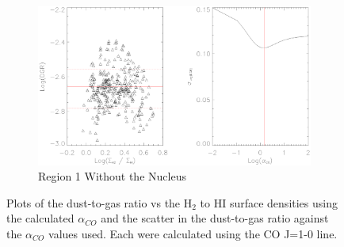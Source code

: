 \begin{figure}
  \ContinuedFloat
  \begin{subfigure}[t]{1\textwidth}
    \centering
    \includegraphics[width=1.\textwidth]{dgr_imgs/region_1-3_aco_output_10.eps}
    \caption{Region 1 Without the Nucleus}
  \end{subfigure}
  \caption[Dust-to-Gas Ratio Determination Plots for CO J=1-0]{Plots of the dust-to-gas ratio vs the H$_2$ to HI surface densities using the calculated $\alpha_{CO}$ and the scatter in the dust-to-gas ratio against the $\alpha_{CO}$ values used.  Each were calculated using the CO J=1-0 line.}
   \label{fig:dgr_co10}
\end{figure}

